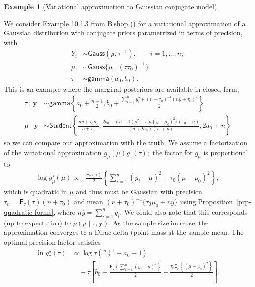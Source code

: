 \documentclass[
  11pt,
  letterpaper,
]{scrbook}
\theoremstyle{definition}
\theoremstyle{plain}
\theoremstyle{plain}
\theoremstyle{plain}
\theoremstyle{definition}
\newtheorem{example}{Example}[chapter]
\theoremstyle{definition}
\theoremstyle{remark}
\begin{document}
\begin{example}[Variational approximation to Gaussian conjugate
model]\protect\hypertarget{exm-gaussian-variational-approx}{}\label{exm-gaussian-variational-approx}

We consider Example 10.1.3 from Bishop
() for a variational approximation of a
Gaussian distribution with conjugate priors parametrized in terms of
precision, with \begin{align*}
Y_i &\sim \mathsf{Gauss}(\mu, \tau^{-1}), \qquad i =1, \ldots, n;\\
\mu &\sim \mathsf{Gauss}\{\mu_0, (\tau\tau_0)^{-1}\} \\
\tau &\sim \mathsf{gamma}(a_0, b_0).
\end{align*} This is an example where the marginal posteriors are
available in closed-form, \begin{align*}
\tau \mid \boldsymbol{y} &\sim \mathsf{gamma}\left\{ a_0 + \frac{n-1}{2}, b_0 + \frac{\sum_{i=1}^n y_i^2 + (n+\tau_0)^{-1}(n\overline{y}+\tau_0)^2}{2}\right\} 
\\ \mu \mid \boldsymbol{y} &\sim \mathsf{Student}\left\{ \frac{n\overline{y}+\tau_0\mu_0}{n+\tau_0}, \frac{2b_0 +(n-1)s^2 + \tau_0n(\overline{y}-\mu_0)^2/(\tau_0+n)}{(n+2a_0)(\tau_0+n)}, 2a_0+n\right\}
\end{align*} so we can compare our approximation with the truth. We
assume a factorization of the variational approximation
\(g_\mu(\mu)g_\tau(\tau);\) the factor for \(g_\mu\) is proportional to
\begin{align*}
 \log g^{\star}_{\mu}(\mu) \propto -\frac{\mathsf{E}_{\tau}(\tau)}{2} \left\{ \sum_{i=1}^n (y_i-\mu)^2 + \tau_0(\mu-\mu_0)^2\right\},
\end{align*} which is quadratic in \(\mu\) and thus must be Gaussian
with precision \(\tau_n = \mathsf{E}_{\tau}(\tau)(n + \tau_0)\) and mean
\((n + \tau_0)^{-1}\{\tau_0\mu_0 + n\overline{y}\}\) using
Proposition~\ref{prp-quadratic-forms}, where
\(n\overline{y} = \sum_{i=1}^n y_i.\) We could also note that this
corresponds (up to expectation) to \(p(\mu \mid \tau, \boldsymbol{y}).\)
As the sample size increase, the approximation converges to a Dirac
delta (point mass at the sample mean. The optimal precision factor
satisfies \begin{align*}
 \ln g^{\star}_{\tau}(\tau) &\propto \log \tau\left(\frac{n+1}{2} + a_0-1\right)   \\&\quad- \tau \left[b_0  + \frac{\mathsf{E}_{\mu}\left\{\sum_{i=1}^n (y_i-\mu)^2\right\}}{2}  + \frac{\tau_0\mathsf{E}_{\mu}\left\{(\mu-\mu_0)^2\right\}}{2}\right].

\end{align*}
\end{example}
\end{document}

